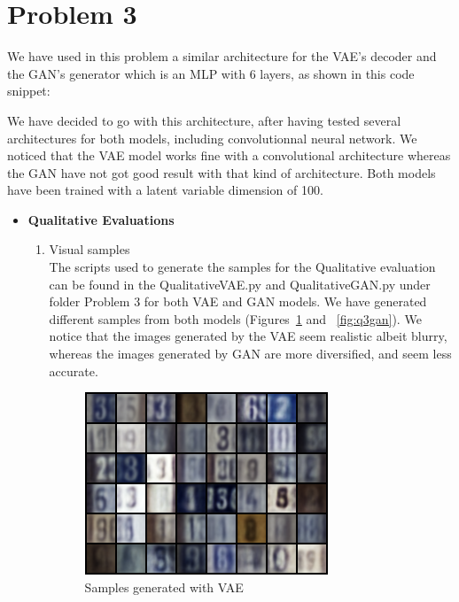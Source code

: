 \section*{Problem 3}
We have used in this problem a similar architecture for the VAE's decoder and the GAN's generator which is an MLP with 6 layers, as shown in this code snippet:


We have decided to go with this architecture, after having tested several architectures for both models, including convolutionnal neural network. We noticed that the VAE model works fine with a convolutional architecture whereas the GAN have not got good result with that kind of architecture. Both models have been trained with a latent variable dimension of 100.

\begin{itemize}
\item[A.] {\textbf{Qualitative Evaluations}}\\
\begin{enumerate}
	\item[1.]{Visual samples}\\
	The scripts used to generate the samples for the Qualitative evaluation can be found in the QualitativeVAE.py and QualitativeGAN.py under folder Problem 3 for both VAE and GAN models. 
	We have generated different samples from both models (Figures~\ref{fig:q3vae} and ~\ref{fig:q3gan}). We notice that the images generated by the VAE seem realistic albeit blurry, whereas the images generated by GAN are more diversified, and seem less accurate. 
	\begin{figure}[H]
		\centering
		\includegraphics[scale=1]{Q3vaesample.png}
		\caption{Samples generated with VAE}
		\label{fig:q3vae}
	\end{figure}
	

\end{enumerate}
\end{itemize}
